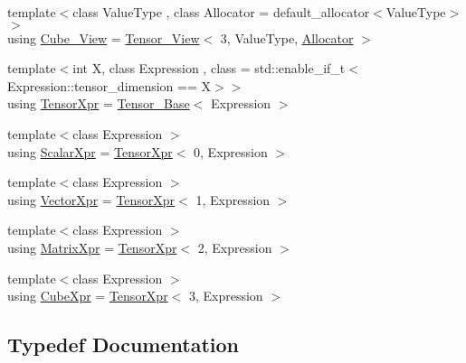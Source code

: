 \begin{DoxyCompactItemize}
\item 
{\footnotesize template$<$class Value\+Type , class Allocator  = default\+\_\+allocator$<$\+Value\+Type$>$$>$ }\\using \hyperlink{namespaceBC_1_1tensors_1_1common__using_aebb5c43471e1526b4e27c2c6bd26a1f5}{Cube\+\_\+\+View} = \hyperlink{namespaceBC_1_1tensors_1_1common__using_aa7ad21a0b7b01eeedea2f0eccb4ed15f}{Tensor\+\_\+\+View}$<$ 3, Value\+Type, \hyperlink{namespaceBC_a934f94b17b06290e6b241e5f59930c5f}{Allocator} $>$
\item 
{\footnotesize template$<$int X, class Expression , class  = std\+::enable\+\_\+if\+\_\+t$<$\+Expression\+::tensor\+\_\+dimension == X$>$$>$ }\\using \hyperlink{namespaceBC_1_1tensors_1_1common__using_a435d2e2b94686b268ba1c3049f6afa68}{Tensor\+Xpr} = \hyperlink{classBC_1_1tensors_1_1Tensor__Base}{Tensor\+\_\+\+Base}$<$ Expression $>$
\item 
{\footnotesize template$<$class Expression $>$ }\\using \hyperlink{namespaceBC_1_1tensors_1_1common__using_a3071d1b3c16b2e974c99dc6cc8b6292d}{Scalar\+Xpr} = \hyperlink{namespaceBC_1_1tensors_1_1common__using_a435d2e2b94686b268ba1c3049f6afa68}{Tensor\+Xpr}$<$ 0, Expression $>$
\item 
{\footnotesize template$<$class Expression $>$ }\\using \hyperlink{namespaceBC_1_1tensors_1_1common__using_ab568becd4b1421e4a6d7d34ebb8cdae9}{Vector\+Xpr} = \hyperlink{namespaceBC_1_1tensors_1_1common__using_a435d2e2b94686b268ba1c3049f6afa68}{Tensor\+Xpr}$<$ 1, Expression $>$
\item 
{\footnotesize template$<$class Expression $>$ }\\using \hyperlink{namespaceBC_1_1tensors_1_1common__using_ab190d78daaf06c9290b6dd7d6e1a2bdf}{Matrix\+Xpr} = \hyperlink{namespaceBC_1_1tensors_1_1common__using_a435d2e2b94686b268ba1c3049f6afa68}{Tensor\+Xpr}$<$ 2, Expression $>$
\item 
{\footnotesize template$<$class Expression $>$ }\\using \hyperlink{namespaceBC_1_1tensors_1_1common__using_ad8b8adb3201b9219bdaefd7b6afb6e9f}{Cube\+Xpr} = \hyperlink{namespaceBC_1_1tensors_1_1common__using_a435d2e2b94686b268ba1c3049f6afa68}{Tensor\+Xpr}$<$ 3, Expression $>$
\end{DoxyCompactItemize}


\subsection{Typedef Documentation}
